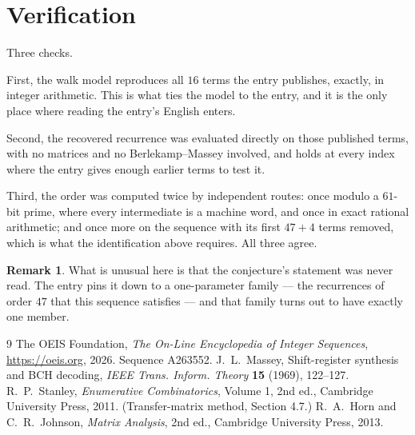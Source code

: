 \documentclass[11pt,a4paper]{article}
\theoremstyle{plain}
\theoremstyle{definition}
\newtheorem{remark}[theorem]{Remark}
\begin{document}
\section{Verification}

Three checks.

First, the walk model reproduces all $16$ terms the entry publishes, exactly, in integer
arithmetic. This is what ties the model to the entry, and it is the only place where reading
the entry's English enters.

Second, the recovered recurrence was evaluated directly on those published terms, with no
matrices and no Berlekamp--Massey involved, and holds at every index where the entry gives
enough earlier terms to test it.

Third, the order was computed twice by independent routes: once modulo a $61$-bit prime, where
every intermediate is a machine word, and once in exact rational arithmetic; and once more on
the sequence with its first $47+4$ terms removed, which is what the identification above
requires. All three agree.

\begin{remark}
What is unusual here is that the conjecture's statement was never read. The entry pins it down
to a one-parameter family --- the recurrences of order $47$ that this sequence satisfies
--- and that family turns out to have exactly one member.
\end{remark}

\begin{thebibliography}{9}
 The OEIS Foundation, \emph{The On-Line Encyclopedia of Integer
Sequences}, \url{https://oeis.org}, 2026. Sequence A263552.
 J.~L.~Massey, Shift-register synthesis and BCH decoding, \emph{IEEE
Trans. Inform. Theory} \textbf{15} (1969), 122--127.
 R.~P.~Stanley, \emph{Enumerative Combinatorics}, Volume 1, 2nd ed.,
Cambridge University Press, 2011. (Transfer-matrix method, Section 4.7.)
 R.~A.~Horn and C.~R.~Johnson, \emph{Matrix Analysis}, 2nd ed., Cambridge
University Press, 2013.
\end{thebibliography}
\end{document}
